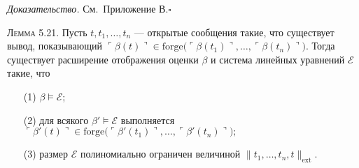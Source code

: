 \textit{Доказательство.} См.\ Приложение В.\hfill$\square$

\textsc{Лемма 5.21.}
Пусть $t,t_{1},\dots,t_{n}$ — открытые сообщения такие, что
существует вывод, показывающий
\(
   \ulcorner\beta(t)\urcorner \in \mathrm{forge}
   \bigl(\ulcorner\beta(t_{1})\urcorner,\dots,
         \ulcorner\beta(t_{n})\urcorner\bigr)
\).
Тогда существует расширение отображения оценки $\beta$
и система линейных уравнений $\mathcal E$ такие, что

\begin{enumerate}\itemsep0pt
\item[\textup{(1)}] \(\beta\models\mathcal E\);
\item[\textup{(2)}] для всякого \(\beta'\models\mathcal E\)
      выполняется
      \(
        \ulcorner\beta'(t)\urcorner \in
        \mathrm{forge}\bigl(\ulcorner\beta'(t_{1})\urcorner,\dots,
                            \ulcorner\beta'(t_{n})\urcorner\bigr);
      \)
\item[\textup{(3)}] размер $\mathcal E$ полиномиально ограничен
      величиной \(\lVert t_{1},\dots,t_{n},t\rVert_{\text{ext}}\).
\end{enumerate}

